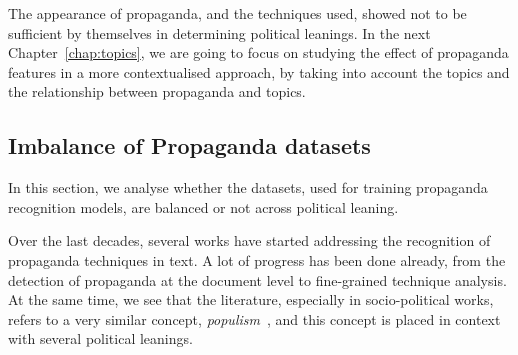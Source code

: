 The appearance of propaganda, and the techniques used, showed not to be sufficient by themselves in determining political leanings. In the next Chapter~\ref{chap:topics}, we are going to focus on studying the effect of propaganda features in a more contextualised approach, by taking into account the topics and the relationship between propaganda and topics.








\subsection{\statusorange Imbalance of Propaganda datasets}
\label{ssec:ps_prop_leaning_imbalanced}


In this section, we analyse whether the datasets, used for training propaganda recognition models, are balanced or not across political leaning.



Over the last decades, several works have started addressing the recognition of propaganda techniques in text. A lot of progress has been done already, from the detection of propaganda at the document level to fine-grained technique analysis. %
At the same time, we see that the literature, especially in socio-political works, refers to a very similar concept, \emph{populism}~\citep{tumber2021routledge,pasquino2008populism}, and this concept is placed in context with several political leanings.



